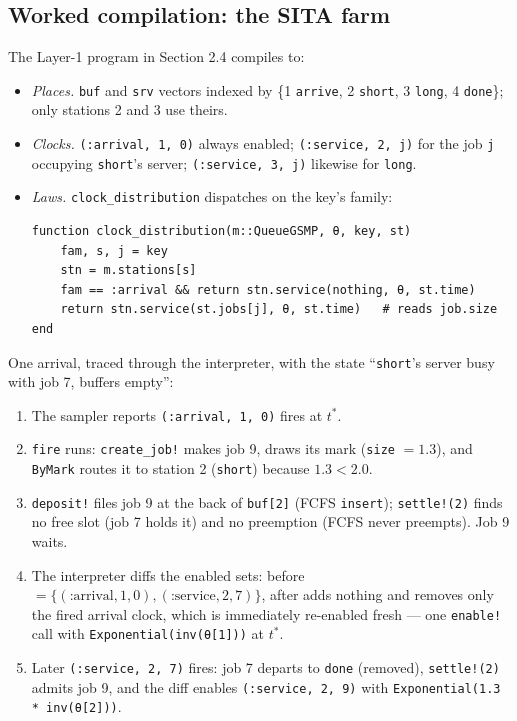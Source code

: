 \documentclass[11pt]{article}
\newcommand{\code}[1]{\texttt{#1}}
\begin{document}
\subsection{Worked compilation: the SITA farm}
\label{sec:worked}

The Layer-1 program in Section 2.4 compiles to:

\begin{itemize}
\item \emph{Places.} \code{buf} and \code{srv} vectors indexed by
  \{1 \code{arrive}, 2 \code{short}, 3 \code{long}, 4 \code{done}\}; only
  stations 2 and 3 use theirs.
\item \emph{Clocks.} \code{(:arrival, 1, 0)} always enabled;
  \code{(:service, 2, j)} for the job \code{j} occupying \code{short}'s
  server; \code{(:service, 3, j)} likewise for \code{long}.
\item \emph{Laws.} \code{clock\_distribution} dispatches on the key's family:
\begin{lstlisting}
function clock_distribution(m::QueueGSMP, θ, key, st)
    fam, s, j = key
    stn = m.stations[s]
    fam == :arrival && return stn.service(nothing, θ, st.time)
    return stn.service(st.jobs[j], θ, st.time)   # reads job.size
end
\end{lstlisting}
\end{itemize}

One arrival, traced through the interpreter, with the state
``\code{short}'s server busy with job 7, buffers empty'':

\begin{enumerate}
\item The sampler reports \code{(:arrival, 1, 0)} fires at $t^\ast$.
\item \code{fire} runs: \code{create\_job!} makes job 9, draws its mark
  (\code{size} $= 1.3$), and \code{ByMark} routes it to station 2
  (\code{short}) because $1.3 < 2.0$.
\item \code{deposit!} files job 9 at the back of \code{buf[2]} (FCFS
  \code{insert}); \code{settle!(2)} finds no free slot (job 7 holds it) and
  no preemption (FCFS never preempts). Job 9 waits.
\item The interpreter diffs the enabled sets: before
  $= \{(\text{:arrival},1,0), (\text{:service},2,7)\}$, after adds nothing
  and removes only the fired arrival clock, which is immediately re-enabled
  fresh --- one \code{enable!} call with
  \code{Exponential(inv(θ[1]))} at $t^\ast$.
\item Later \code{(:service, 2, 7)} fires: job 7 departs to \code{done}
  (removed), \code{settle!(2)} admits job 9, and the diff enables
  \code{(:service, 2, 9)} with \code{Exponential(1.3 * inv(θ[2]))}.
\end{enumerate}
\end{document}
